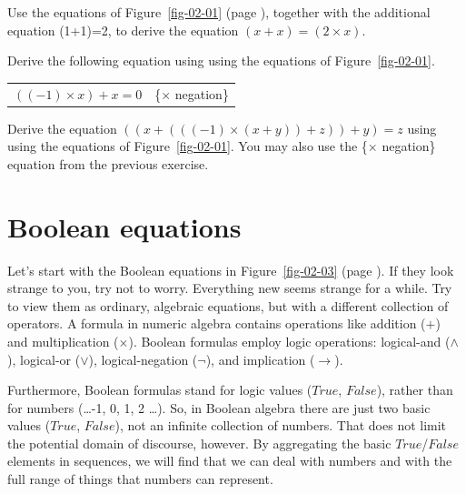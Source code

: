\begin{ExerciseList}
\label{ex:ch02-intro}
\Exercise
Use the equations of Figure~\ref{fig-02-01} (page \pageref{fig-02-01}),
together with the additional equation (1+1)=2, to derive the equation $(x + x) = (2 \times x)$.

\Exercise
Derive the following equation
using using the equations of Figure~\ref{fig-02-01}.
\begin{center}
\begin{tabular}{ll}
$((-1) \times x) + x = 0$    & \{$\times$ negation\}
\end{tabular}
\end{center}


\Exercise
Derive the equation $((x + (((-1) \times (x + y)) + z)) + y) = z$
using using the equations of Figure~\ref{fig-02-01}.
You may also use the \{$\times$ negation\} equation from the previous exercise.
\end{ExerciseList}

\section{Boolean equations}
\label{sec:boolean-equations}
Let's start with the Boolean equations in Figure~\ref{fig-02-03} (page \pageref{fig-02-03}).
If they look strange to you, try not to worry. Everything new seems
strange for a while. Try to view them as ordinary, algebraic
equations, but with a different collection of operators. A
formula in numeric algebra contains operations like addition
($+$) and multiplication ($\times$). Boolean formulas employ logic
operations: logical-and ($\wedge$), logical-or ($\vee$),
logical-negation ($\neg$), and implication ($\rightarrow$).

Furthermore, Boolean formulas stand for logic values
($True$, $False$), rather than for numbers (\dots -1, 0, 1, 2 \dots).
So, in Boolean algebra there are just two basic values ($True$, $False$),
not an infinite collection of numbers.
That does not limit the potential domain of discourse, however. By
aggregating the basic $True$/$False$ elements in sequences, we
will find that we can deal with numbers and with the full range of things that
numbers can represent.

